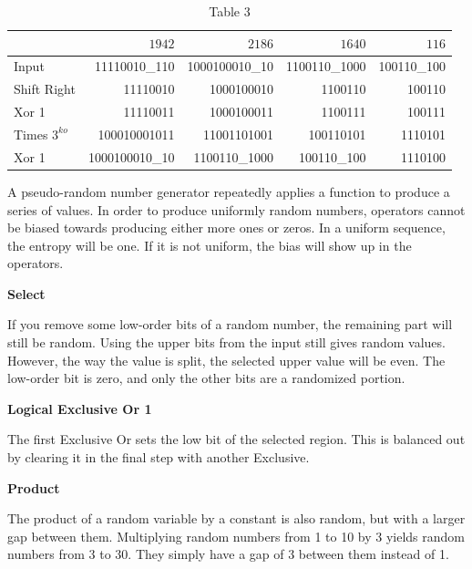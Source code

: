 \documentclass[preprint]{sigplanconf}
\begin{document}
\begin{table}
    \begin{center}
        \begin{tabular}{|l|r|r|r|r|}
            \hline
                           & \textbf{$1942$} & \textbf{$2186$} & \textbf{$1640$} & \textbf{$116$} \\
            \hline
            Input          & 11110010\_110   & 1000100010\_10  & 1100110\_1000   & 100110\_100    \\
            \hline
            Shift Right    & 11110010        & 1000100010      & 1100110         & 100110         \\
            \hline
            Xor 1          & 11110011        & 1000100011      & 1100111         & 100111         \\
            \hline
            Times $3^{ko}$ & 100010001011    & 11001101001     & 100110101       & 1110101        \\
            \hline
            Xor 1          & 1000100010\_10  & 1100110\_1000   & 100110\_100     & 1110100        \\
            \hline
        \end{tabular}
        \caption{Table 3}
        \label{tab-3}
    \end{center}
\end{table}

A pseudo-random number generator repeatedly applies a function to produce a series of values. In order to produce uniformly random numbers, operators cannot be biased towards producing either more ones or zeros. In a uniform sequence, the entropy will be one. If it is not uniform, the bias will show up in the operators.

\textbf{Select}

If you remove some low-order bits of a random number, the remaining part will still be random. Using the upper bits from the input still gives random values. However, the way the value is split, the selected upper value will be even. The low-order bit is zero, and only the other bits are a randomized portion.

\textbf{Logical Exclusive Or 1}

The first Exclusive Or sets the low bit of the selected region. This is balanced out by clearing it in the final step with another Exclusive.

\textbf{Product}

The product of a random variable by a constant is also random, but with a larger gap between them. Multiplying random numbers from 1 to 10 by 3 yields random numbers from 3 to 30. They simply have a gap of 3 between them instead of 1.
\end{document}
